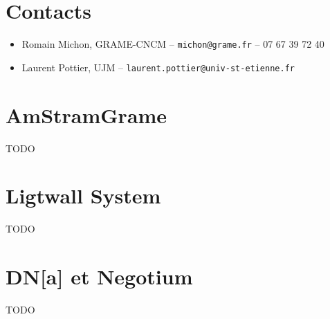 \documentclass[fontsize=12pt]{scrartcl} %
\numberwithin{equation}{section} %
\numberwithin{figure}{section} %
\numberwithin{table}{section} %
\begin{document}
\section{Contacts}

\begin{itemize}
\item Romain Michon, GRAME-CNCM -- \texttt{michon@grame.fr} -- 07 67 39 72 40
\item Laurent Pottier, UJM -- \texttt{laurent.pottier@univ-st-etienne.fr} %
\end{itemize}

\appendix

\section{AmStramGrame}
\label{app:amstram}

TODO

\section{Ligtwall System}
\label{app:lightwall}

TODO

\section{DN[a] et Negotium}
\label{app:dna}

TODO
\end{document}
